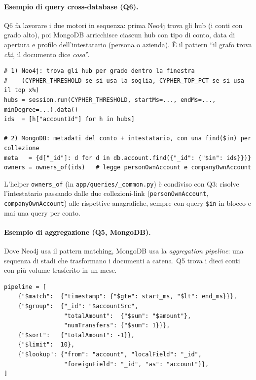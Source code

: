 \documentclass[11pt,a4paper]{article}
\begin{document}
\paragraph{Esempio di query cross-database (Q6).} Q6 fa lavorare i due motori in
sequenza: prima Neo4j trova gli hub (i conti con grado alto), poi MongoDB
arricchisce ciascun hub con tipo di conto, data
di apertura e profilo dell'intestatario (persona o azienda). \`E il pattern
``il grafo trova \emph{chi}, il documento dice \emph{cosa}''.

\begin{lstlisting}[style=py,caption={Q6 -- la parte di orchestrazione cross-database (Python).},captionpos=b]
# 1) Neo4j: trova gli hub per grado dentro la finestra
#    (CYPHER_THRESHOLD se si usa la soglia, CYPHER_TOP_PCT se si usa il top x%)
hubs = session.run(CYPHER_THRESHOLD, startMs=..., endMs=..., minDegree=...).data()
ids  = [h["accountId"] for h in hubs]

# 2) MongoDB: metadati del conto + intestatario, con una find($in) per collezione
meta   = {d["_id"]: d for d in db.account.find({"_id": {"$in": ids}})}
owners = owners_of(ids)   # legge personOwnAccount e companyOwnAccount
\end{lstlisting}

L'helper \texttt{owners\_of} (in \texttt{app/queries/\_common.py}) \`e condiviso
con Q3: risolve l'intestatario passando dalle due collezioni-link
(\texttt{personOwnAccount}, \texttt{companyOwnAccount}) alle rispettive
anagrafiche, sempre con query \texttt{\$in} in blocco e mai una query per conto.

\paragraph{Esempio di aggregazione (Q5, MongoDB).} Dove Neo4j usa il pattern
matching, MongoDB usa la \emph{aggregation pipeline}: una sequenza di stadi che
trasformano i documenti a catena. Q5 trova i dieci conti con pi\`u volume
trasferito in un mese.

\begin{lstlisting}[style=py,caption={Q5 -- aggregation pipeline di MongoDB.},captionpos=b]
pipeline = [
    {"$match":  {"timestamp": {"$gte": start_ms, "$lt": end_ms}}},
    {"$group":  {"_id": "$accountSrc",
                 "totalAmount":  {"$sum": "$amount"},
                 "numTransfers": {"$sum": 1}}},
    {"$sort":   {"totalAmount": -1}},
    {"$limit":  10},
    {"$lookup": {"from": "account", "localField": "_id",
                 "foreignField": "_id", "as": "account"}},
]
\end{lstlisting}
\end{document}
